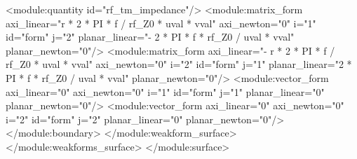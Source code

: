\documentclass[12pt,a4paper,oneside]{article}
\numberwithin{equation}{section} %
\numberwithin{figure}{section} %
\numberwithin{table}{section} %
\begin{document}
\begin{spverbatim}
          <module:quantity id="rf_tm_impedance"/>
          <module:matrix_form axi_linear="r * 2 * PI * f / rf_Z0 * uval * vval" axi_newton="0" i="1" id="form" j="2" planar_linear="- 2 * PI * f * rf_Z0 / uval * vval" planar_newton="0"/>
          <module:matrix_form axi_linear="- r * 2 * PI * f / rf_Z0 * uval * vval" axi_newton="0" i="2" id="form" j="1" planar_linear="2 * PI * f * rf_Z0 / uval * vval" planar_newton="0"/>
          <module:vector_form axi_linear="0" axi_newton="0" i="1" id="form" j="1" planar_linear="0" planar_newton="0"/>
          <module:vector_form axi_linear="0" axi_newton="0" i="2" id="form" j="2" planar_linear="0" planar_newton="0"/>
        </module:boundary>
      </module:weakform_surface>
    </module:weakforms_surface>
  </module:surface>
\end{spverbatim}
\end{document}
